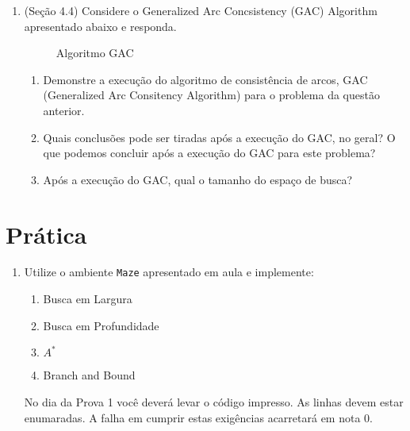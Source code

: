 \documentclass{article}
\begin{document}
\begin{enumerate}
\item (Seção 4.4) Considere o Generalized Arc Concsistency (GAC) Algorithm apresentado abaixo e responda.

\begin{figure}[!t]
    
    \caption{Algoritmo GAC}
\end{figure}

\begin{enumerate}
    \item Demonstre a execução do algoritmo de consistência de arcos, GAC (Generalized Arc Consitency Algorithm) para o problema da questão anterior.
    \item Quais conclusões pode ser tiradas após a execução do GAC, no geral? O que podemos concluir após a execução do GAC para este problema?
    \item Após a execução do GAC, qual o tamanho do espaço de busca?
\end{enumerate}

\end{enumerate}

\section{Prática}

\begin{enumerate}
    \item Utilize o ambiente \texttt{Maze} apresentado em aula e implemente:
    \begin{enumerate}
        \item Busca em Largura 
        \item Busca em Profundidade
        \item $A^*$
        \item Branch and Bound 
    \end{enumerate} 
    No dia da Prova 1 você deverá levar o código impresso. As linhas devem estar enumaradas. A falha em cumprir estas exigências acarretará em nota 0.
\end{enumerate}


\end{document}
